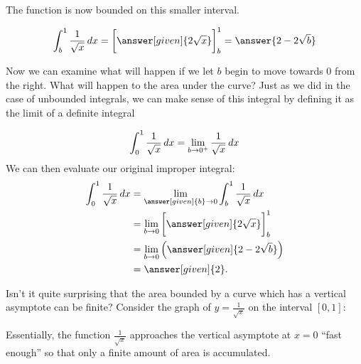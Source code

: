 \documentclass{ximera}
\begin{document}
\begin{example}
\begin{explanation}
The function is now bounded on this smaller interval. 

\[
\int_{b}^1 \frac{1}{\sqrt{x}} \d x=  \eval{\answer[given]{2\sqrt{x}}}_b^1=\answer{2-2\sqrt{b}}
\]

Now we can examine what will happen if we let $b$ begin to move towards $0$ from the right. What will happen to the area under the curve? 
Just as we did in the case of unbounded integrals, we can make sense of this integral by defining it as the limit of a definite integral 

\[
\int_{0}^{1} \frac{1}{\sqrt{x}} \mathop{}\!d x=\lim_{b \to 0^{+}} \frac{1}{\sqrt{x}} \mathop{}\!d x
\]
We can then evaluate our original improper integral: 
    \begin{align*}
      \int_{0}^1 \frac{1}{\sqrt{x}} \d x &= \lim_{\answer[given]{b} \to 0} \int_{b}^1 \frac{1}{\sqrt{x}} \d x \\
      &=  \lim_{b \to 0}  \eval{\answer[given]{2\sqrt{x}}}_b^1 \\
      &=  \lim_{b \to 0} \left(\answer[given]{2-2\sqrt{b}}\right)\\
      &= \answer[given]{2}.
    \end{align*}

Isn't it quite surprising that the area bounded by a curve which has a
vertical asymptote can be finite? Consider the graph of $y=
\frac{1}{\sqrt{x}}$ on the interval $[0,1]$:

\begin{image}
\end{image}

Essentially, the function $\frac{1}{\sqrt{x}}$ approaches the vertical asymptote at $x=0$ ``fast enough'' so that only a finite amount of area is accumulated. 

  \end{explanation}
\end{example}
\end{document}
